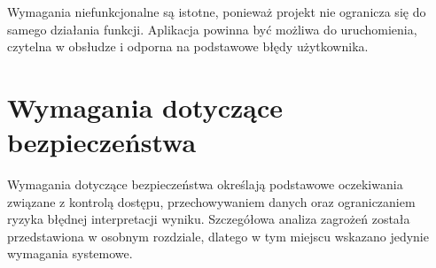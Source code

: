 Wymagania niefunkcjonalne są istotne, ponieważ projekt nie ogranicza się do samego działania funkcji. Aplikacja powinna być możliwa do uruchomienia, czytelna w obsłudze i odporna na podstawowe błędy użytkownika.

\section{Wymagania dotyczące bezpieczeństwa}

Wymagania dotyczące bezpieczeństwa określają podstawowe oczekiwania związane z kontrolą dostępu, przechowywaniem danych oraz ograniczaniem ryzyka błędnej interpretacji wyniku. Szczegółowa analiza zagrożeń została przedstawiona w osobnym rozdziale, dlatego w tym miejscu wskazano jedynie wymagania systemowe.

\renewcommand{\arraystretch}{1.15}
